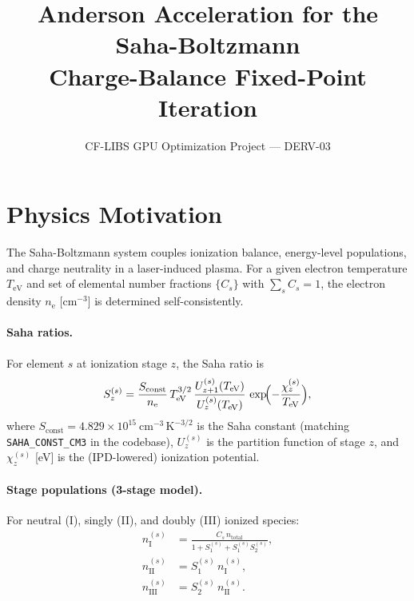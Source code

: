 \documentclass[11pt]{article}
\title{Anderson Acceleration for the Saha-Boltzmann\\
Charge-Balance Fixed-Point Iteration}
\author{CF-LIBS GPU Optimization Project --- DERV-03}
\date{}
\newcommand{\ne}{n_\mathrm{e}}
\newcommand{\TeV}{T_\mathrm{eV}}
\newcommand{\Sconst}{S_\mathrm{const}}
\begin{document}
\maketitle

\section{Physics Motivation}
\label{sec:motivation}

The Saha-Boltzmann system couples ionization balance, energy-level
populations, and charge neutrality in a laser-induced plasma.  For a
given electron temperature $\TeV$ and set of elemental number fractions
$\{C_s\}$ with $\sum_s C_s = 1$, the electron density $\ne$
[$\mathrm{cm}^{-3}$] is determined self-consistently.

\paragraph{Saha ratios.}
For element $s$ at ionization stage $z$, the Saha ratio is
%
\begin{equation}
  \label{eq:saha-ratio}
  S_z^{(s)}
  = \frac{\Sconst}{\ne}\,\TeV^{3/2}\,
    \frac{U_{z+1}^{(s)}(\TeV)}{U_z^{(s)}(\TeV)}\,
    \exp\!\Bigl(-\frac{\chi_z^{(s)}}{\TeV}\Bigr),
\end{equation}
%
where $\Sconst = 4.829\times10^{15}~\mathrm{cm}^{-3}\,\mathrm{K}^{-3/2}$
is the Saha constant (matching \texttt{SAHA\_CONST\_CM3} in the codebase),
$U_z^{(s)}$ is the partition function of stage $z$, and $\chi_z^{(s)}$ [eV]
is the (IPD-lowered) ionization potential.


\paragraph{Stage populations (3-stage model).}
For neutral (I), singly (II), and doubly (III) ionized species:
%
\begin{align}
  n_\mathrm{I}^{(s)}   &= \frac{C_s\,n_\mathrm{total}}{1 + S_1^{(s)} + S_1^{(s)} S_2^{(s)}},
  \label{eq:nI}\\
  n_\mathrm{II}^{(s)}  &= S_1^{(s)}\,n_\mathrm{I}^{(s)},
  \label{eq:nII}\\
  n_\mathrm{III}^{(s)} &= S_2^{(s)}\,n_\mathrm{II}^{(s)}.
  \label{eq:nIII}
\end{align}
%
\end{document}
